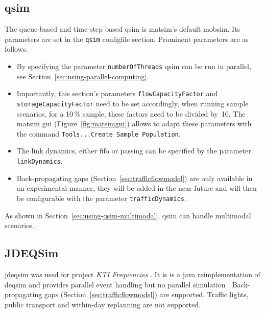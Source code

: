 \subsection{\protect\gls{qsim}}
\label{sec:using-qsim}
The queue-based and time-step based \gls{qsim} \citep[][]{Dobler_TechRep_IVT_2011, Dobler_STRC_2010} is \gls{matsim}'s default \gls{mobsim}. 
Its parameters are set in the \lstinline|qsim| \gls{configfile} section. Prominent parameters are as follows.
\begin{itemize} 

\item
By specifying the parameter \lstinline|numberOfThreads| \gls{qsim} can be run in parallel, see Section~\ref{sec:using-parallel-computing}. 

\item Importantly, this section's parameters \lstinline|flowCapacityFactor| and \lstinline|storageCapacityFactor| need to be set accordingly, when running sample scenarios, \eg for a 10\,\% sample, these factors need to be divided by~10. The \gls{matsim} \gls{gui} (Figure~\ref{fig:matsimgui}) allows to adapt these parameters with the command \lstinline|Tools...Create Sample Population|.

\item
The link dynamics, either \gls{fifo} or passing can be specified by the parameter \lstinline|linkDynamics|. 

\item
Back-propagating gaps (Section~\ref{sec:trafficflowmodel}) are only available in an experimental manner, 
they will be added in the near future and will then be configurable with the parameter \lstinline|trafficDynamics|. 
\end{itemize}

As shown in Section~\ref{sec:using-qsim-multimodal}, \gls{qsim} can handle \gls{multimodal} scenarios. %


\subsection{JDEQSim}
\label{sec:using-jdeqsim}
\gls{jdeqsim} \citep[][]{WaraichEtAl_TechRep_IVT_2009, WaraichEtAl_STRC_2009} was used for project \emph{KTI Frequencies} \citep[][]{BalmerEtAl_ResRep_datapuls_2010}. It is is a \gls{java} reimplementation of \gls{deqsim} \citep[][]{WaraichEtAl_STRC_2009, CharyparEtAl_TRR_2007, CharyparEtAl_TRB_2009} and provides parallel event handling but no parallel simulation \citep[][p.11]{BalmerEtAl_ResRep_datapuls_2010}. Back-propagating gaps (Section~\ref{sec:trafficflowmodel}) are supported. Traffic lights, public transport and within-day replanning are not supported.

